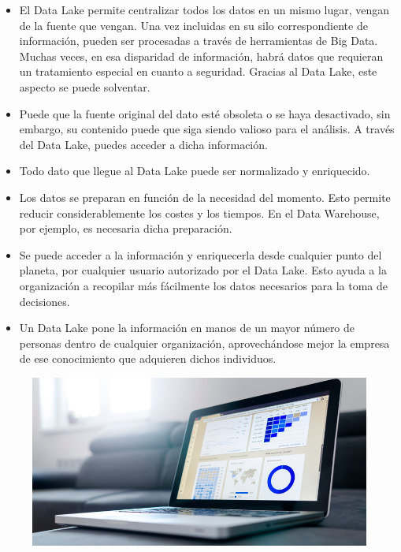\documentclass[preprint,12pt]{elsarticle}
\begin{document}
\begin{itemize}

\item El Data Lake permite centralizar todos los datos en un mismo lugar, vengan de la fuente que vengan. Una vez incluidas en su silo correspondiente de información, pueden ser procesadas a través de herramientas de Big Data. Muchas veces, en esa disparidad de información, habrá datos que requieran un tratamiento especial en cuanto a seguridad. Gracias al Data Lake, este aspecto se puede solventar.
\item Puede que la fuente original del dato esté obsoleta o se haya desactivado, sin embargo, su contenido puede que siga siendo valioso para el análisis. A través del Data Lake, puedes acceder a dicha información.
\item Todo dato que llegue al Data Lake puede ser normalizado y enriquecido.
\item Los datos se preparan en función de la necesidad del momento. Esto permite reducir considerablemente los costes y los tiempos. En el Data Warehouse, por ejemplo, es necesaria dicha preparación.
\item Se puede acceder a la información y enriquecerla desde cualquier punto del planeta, por cualquier usuario autorizado por el Data Lake. Esto ayuda a la organización a recopilar más fácilmente los datos necesarios para la toma de decisiones.
\item Un Data Lake pone la información en manos de un mayor número de personas dentro de cualquier organización, aprovechándose mejor la empresa de ese conocimiento que adquieren dichos individuos.

\end{itemize}
\begin{figure}[htb]
				\begin{center}
					\includegraphics[width=15cm]{./IMAGENES/leydi2}
				\end{center}
			\end{figure}
\end{document}

